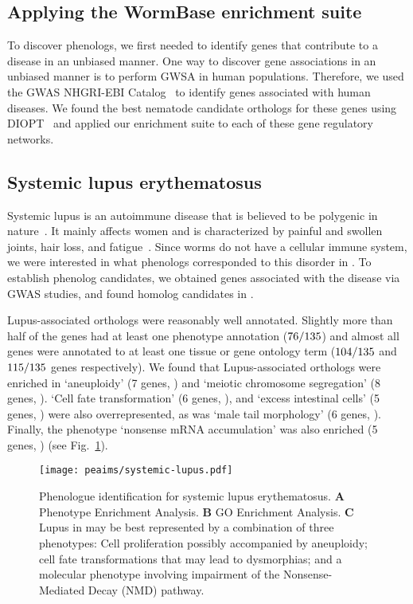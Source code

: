 \subsection*{Applying the WormBase enrichment suite}
To discover phenologs, we first needed to identify genes that
contribute to a disease in an unbiased manner. One way to discover gene
associations in an unbiased manner is to perform GWSA in human populations.
Therefore, we used the GWAS NHGRI-EBI
Catalog~\citep{MacArthur2016} to identify genes associated with human diseases. We found the
best nematode candidate orthologs for these genes using DIOPT~\citep{Hu2011} and applied
our enrichment suite to each of these gene regulatory networks.

\subsection*{Systemic lupus erythematosus}
Systemic lupus is an autoimmune disease that is believed to be polygenic in
nature~\citep{Mohan2015}. It mainly affects women and is characterized by painful
and swollen joints, hair loss, and fatigue~\citep{Lisnevskaia2014}. Since worms do not have a
cellular immune system, we were interested in what phenologs corresponded to
this disorder in \cel{}. To establish phenolog candidates, we obtained
\hlupus{} genes associated with the disease via GWAS studies, and found
\wlupus{} homolog candidates in \cel{}.

Lupus-associated orthologs were reasonably well annotated. Slightly more than half
of the genes had at least one phenotype annotation ($76/135{}$) and almost
all genes were annotated to at least one tissue or gene ontology term
($104/135{}$ and $115/135$ genes respectively).
We found that Lupus-associated orthologs were enriched in `aneuploidy' (7 genes,
) and `meiotic chromosome segregation' (8 genes, ). `Cell fate
transformation' (6 genes, ), and `excess intestinal cells'
(5 genes, ) were also overrepresented, as was `male tail morphology'
(6 genes, ). Finally, the phenotype `nonsense mRNA accumulation' was also
enriched (5 genes, ) (see Fig.~\ref{fig:lupus}).

\begin{figure}[htbp]
  \renewcommand{\familydefault}{\sfdefault}\normalfont{}
  \centering
  \texttt{[image: peaims/systemic-lupus.pdf]}
  \caption{Phenologue identification for systemic lupus erythematosus.
           \textbf{A} Phenotype Enrichment Analysis. \textbf{B} GO Enrichment
           Analysis. \textbf{C} Lupus in \cel{} may be best represented by
           a combination of three phenotypes: Cell proliferation possibly
           accompanied by aneuploidy; cell fate transformations that may lead
           to dysmorphias; and a molecular phenotype involving impairment of
           the Nonsense-Mediated Decay (NMD) pathway.}
\label{fig:lupus}
\end{figure}

